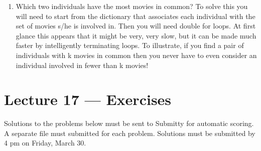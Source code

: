 \documentclass[letterpaper,10pt,english]{sphinxmanual}
\begin{document}
\begin{enumerate}
\item {} 
Which two individuals have the most movies in common? To solve this
you will need to start from the dictionary that associates each
individual with the set of movies s/he is involved in. Then you will
need double for loops.  At first glance this appears that it might
be very, very slow, but it can be made much faster by intelligently
terminating loops.  To illustrate, if you find a pair of
individuals with k movies in common then you never have to even
consider an individual involved in fewer than k movies!

\end{enumerate}


\chapter{Lecture 17 — Exercises}
\label{\detokenize{lecture_notes/lec17_dictionaries2_exercises/exercises:lecture-17-exercises}}\label{\detokenize{lecture_notes/lec17_dictionaries2_exercises/exercises::doc}}
Solutions to the problems below must be sent to Submitty for
automatic scoring.  A separate file must submitted for each problem.
Solutions must be submitted by 4 pm on Friday, March 30.
\end{document}
